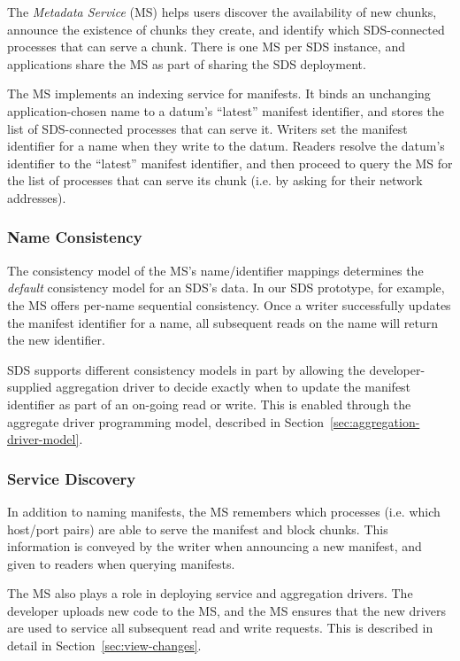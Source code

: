 The \emph{Metadata Service} (MS) helps users discover the
availability of new chunks, announce the existence of chunks they create, and
identify which SDS-connected processes that can serve a chunk.
There is one MS per SDS instance, and
applications share the MS as part of sharing the SDS deployment.

The MS implements an indexing service for manifests.  It binds an unchanging
application-chosen name to a datum's ``latest'' manifest
identifier, and stores the list of SDS-connected processes that can serve it.
Writers set the manifest identifier for a name when they write to the datum.
Readers resolve the datum's identifier to the ``latest'' manifest identifier,
and then proceed to query the MS for the list of processes that can serve its
chunk (i.e. by asking for their network addresses).

\subsubsection{Name Consistency}

The consistency model of the MS's name/identifier mappings determines the \emph{default}
consistency model for an SDS's data.
In our SDS prototype, for example, the MS offers
per-name sequential consistency.  Once a writer successfully updates the manifest
identifier for a name, all subsequent reads on the name will return the new
identifier.

SDS supports different consistency models in part by allowing the
developer-supplied aggregation driver to decide exactly when to update
the manifest identifier as part of an on-going read or write.
This is enabled through the aggregate driver programming model,
described in Section~\ref{sec:aggregation-driver-model}.

\subsubsection{Service Discovery}

In addition to naming manifests, the MS remembers which processes
(i.e. which host/port pairs) are able to serve the manifest and block chunks.
This information is conveyed by the writer when announcing a new manifest,
and given to readers when querying manifests.

The MS also plays a role in deploying service and aggregation drivers.  The
developer uploads new code to the MS, and the MS ensures that the new drivers
are used to service all subsequent read and write requests.  This is described
in detail in Section~\ref{sec:view-changes}.

